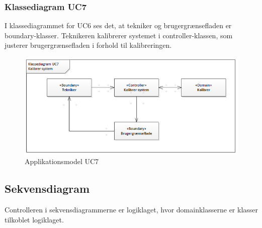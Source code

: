 \subsubsection{Klassediagram UC7}
I klassediagrammet for UC6 ses det, at tekniker og brugergrænsefladen er boundary-klasser. Teknikeren kalibrerer systemet i controller-klassen, som justerer brugergrænsefladen i forhold til kalibreringen. 
\begin{figure}[H]
\centering
\includegraphics[scale=0.70]{app7.PNG}
\caption{Applikationsmodel UC7}
\end{figure}

\newpage

\subsection{Sekvensdiagram}

Controlleren i sekvensdiagrammerne er logiklaget, hvor domainklasserne er klasser tilkoblet logiklaget.

